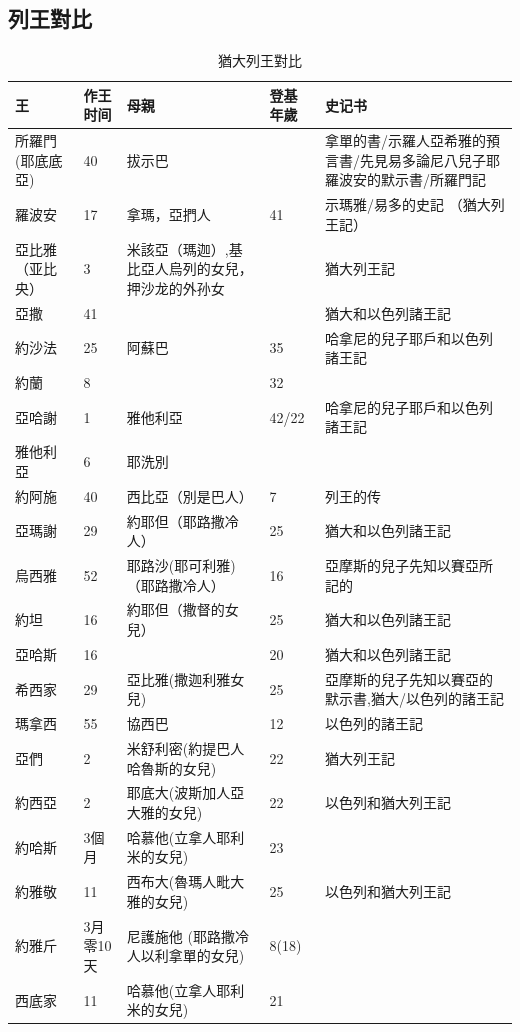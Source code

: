 \subsection{列王對比}
\begin{table}[H]
\centering
\begin{tabular}{p{1.75cm}|p{}|p{3.5cm}|p{0.8cm}|p{8.85cm}}\hline\hline
 王& 作王时间&母親&登基年歲& 史记书\\\hline\hline
 所羅門(耶底底亞)&40 &拔示巴 &   &拿單的書/示羅人亞希雅的預言書/先見易多論尼八兒子耶羅波安的默示書/所羅門記 \\\hline
羅波安&17&拿瑪，亞捫人&41  &示瑪雅/易多的史記 （猶大列王記）\\\hline
 亞比雅（亚比央）&3&米該亞（瑪迦）,基比亞人烏列的女兒，押沙龙的外孙女&  &猶大列王記\\\hline
 亞撒&41 &  & &猶大和以色列諸王記\\\hline
 約沙法 &25 &阿蘇巴  & 35&哈拿尼的兒子耶戶和以色列諸王記\\\hline
 約蘭 &8 &   & 32　&\\\hline
亞哈謝 &1 & 雅他利亞  & 42/22&哈拿尼的兒子耶戶和以色列諸王記\\\hline 
雅他利亞&6 & 耶洗別  & &　 \\\hline  
約阿施 &40  & 西比亞（別是巴人）  &7  &列王的传\\\hline  
亞瑪謝 &29  & 約耶但（耶路撒冷人）  &25  &猶大和以色列諸王記\\\hline 
烏西雅&52  & 耶路沙(耶可利雅)（耶路撒冷人）  &16  &亞摩斯的兒子先知以賽亞所記的\\\hline
約坦 &16  & 約耶但（撒督的女兒）  &25&猶大和以色列諸王記\\\hline
亞哈斯 &16  &    &20&猶大和以色列諸王記\\\hline 
希西家 &29  & 亞比雅(撒迦利雅女兒)&25 &亞摩斯的兒子先知以賽亞的默示書,猶大/以色列的諸王記\\\hline 
瑪拿西 &55  & 協西巴   &12 &以色列的諸王記\\\hline 
亞們 &2  &米舒利密(約提巴人哈魯斯的女兒)    &22 &猶大列王記 \\\hline 
約西亞 &2  & 耶底大(波斯加人亞大雅的女兒)   &22 &以色列和猶大列王記 \\\hline 
約哈斯 &3個月  & 哈慕他(立拿人耶利米的女兒)   &23 &　 \\\hline 
約雅敬 &11  & 西布大(魯瑪人毗大雅的女兒)   &25 &以色列和猶大列王記　 \\\hline 
約雅斤 &3月零10天& 尼護施他 (耶路撒冷人以利拿單的女兒)  &8(18) &　 \\\hline 
西底家 &11  &哈慕他(立拿人耶利米的女兒)    &21 &　 \\\hline 
\end{tabular} 
\caption{猶大列王對比}
\end{table}

